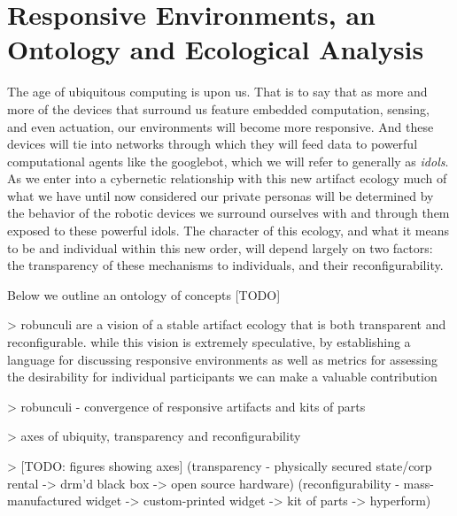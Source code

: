 \section{Responsive Environments, an Ontology and Ecological Analysis}
%

The age of ubiquitous computing \citep{weiser} is upon us. 
That is to say that as more and more of the devices that surround us feature embedded computation, sensing, and even actuation, our environments will become more responsive. 
And these devices will tie into networks through which they will feed data to powerful computational agents like the googlebot, which we will refer to generally as \emph{idols}.
As we enter into a cybernetic relationship with this new artifact ecology much of what we have until now considered our private personas will be determined by the behavior of the robotic devices we surround ourselves with and through them exposed to these powerful idols.
The character of this ecology, and what it means to be and individual within this new order, will depend largely on two factors: the transparency of these mechanisms to individuals, and their reconfigurability.

Below we outline an ontology of concepts [TODO]

> robunculi are a vision of a stable artifact ecology that is both transparent and reconfigurable. while this vision is extremely speculative, by establishing a language for discussing responsive environments as well as metrics for assessing the desirability for individual participants we can make a valuable contribution


> robunculi - convergence of responsive artifacts and kits of parts

> axes of ubiquity, transparency and reconfigurability

> [TODO: figures showing axes] (transparency - physically secured state/corp rental -> drm'd black box -> open source hardware) (reconfigurability - mass-manufactured widget -> custom-printed widget -> kit of parts -> hyperform)

